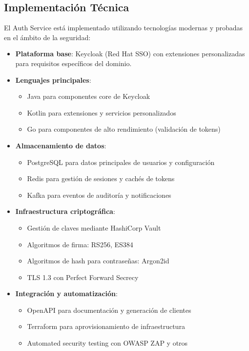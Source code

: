 \documentclass[12pt,a4paper]{article}
\begin{document}
\subsection{Implementación Técnica}
\label{subsec:as-implementacion}

El Auth Service está implementado utilizando tecnologías modernas y probadas en el ámbito de la seguridad:

\begin{itemize}
    \item \textbf{Plataforma base}: Keycloak (Red Hat SSO) con extensiones personalizadas para requisitos específicos del dominio.
    
    \item \textbf{Lenguajes principales}:
    \begin{itemize}
        \item Java para componentes core de Keycloak
        \item Kotlin para extensiones y servicios personalizados
        \item Go para componentes de alto rendimiento (validación de tokens)
    \end{itemize}
    
    \item \textbf{Almacenamiento de datos}:
    \begin{itemize}
        \item PostgreSQL para datos principales de usuarios y configuración
        \item Redis para gestión de sesiones y cachés de tokens
        \item Kafka para eventos de auditoría y notificaciones
    \end{itemize}
    
    \item \textbf{Infraestructura criptográfica}:
    \begin{itemize}
        \item Gestión de claves mediante HashiCorp Vault
        \item Algoritmos de firma: RS256, ES384
        \item Algoritmos de hash para contraseñas: Argon2id
        \item TLS 1.3 con Perfect Forward Secrecy
    \end{itemize}
    
    \item \textbf{Integración y automatización}:
    \begin{itemize}
        \item OpenAPI para documentación y generación de clientes
        \item Terraform para aprovisionamiento de infraestructura
        \item Automated security testing con OWASP ZAP y otros
    \end{itemize}
\end{itemize}
\end{document}
